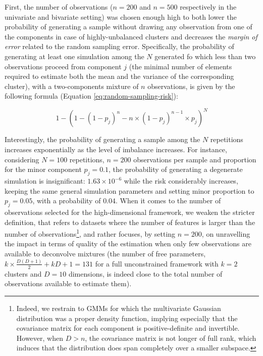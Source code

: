 \label{subsec:benchmark-details}

First, the number of observations (\(n=200\) and \(n=500\) respectively in the univariate and bivariate setting) was chosen enough high to both lower the probability of generating a sample without drawing any observation from one of the components in case of highly-unbalanced clusters and decreases the \emph{margin of error} related to the random sampling error. Specifically, the probability of generating at least one simulation among the \(N\) generated fo which less than two observations proceed from component \(j\) (the minimal number of elements required to estimate both the mean and the variance of the corresponding cluster), with a two-components mixture of \(n\) observations, is given by the following formula (Equation \eqref{eq:random-sampling-risk}):

\begin{equation}
1 - \left(1 - (1-p_j)^n - n \times (1-p_j)^{n-1}\times p_j\right)^N
\label{eq:random-sampling-risk}
\end{equation}

Interestingly, the probability of generating a sample among the \(N\) repetitions increases exponentially as the level of imbalance increases. For instance, considering \(N=100\) repetitions, \(n=200\) observations per sample and proportion for the minor component \(p_j=0.1\), the probability of generating a degenerate simulation is insignificant: \(1.63 \times 10^{-6}\) while the risk considerably increases, keeping the same general simulation parameters and setting minor proportion to \(p_j=0.05\), with a probability of \(0.04\). \color{green} When it comes to the number of observations selected for the high-dimensional framework, we weaken the stricter definition, that refers to datasets where the number of features is larger than the number of observations\footnote{Indeed, we restrain to GMMs for which the multivariate Gaussian distribution was a proper density function, implying especially that the covariance matrix for each component is positive-definite and invertible. However, when \(D>n\), the covariance matrix is not longer of full rank, which induces that the distribution does span completely over a smaller subspace.}, and rather focuses, by setting \(n=200\), on unravelling the impact in terms of quality of the estimation when only few observations are available to deconvolve mixtures (the number of free parameters, \(k \times \frac{D(D+1)}{2} + kD + 1 = 131\) for a full unconstrained framework with \(k=2\) clusters and \(D=10\) dimensions, is indeed close to the total number of observations available to estimate them).\color{black}

